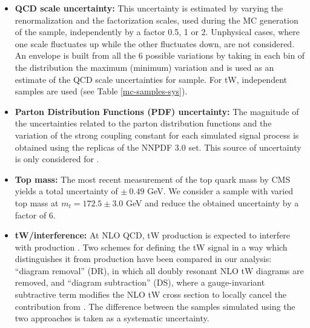 \begin{itemize}
  \item {\textbf{QCD scale uncertainty:} This uncertainty is estimated by varying the renormalization and the factorization scales, used during the MC generation of the sample, independently by a factor 0.5, 1 or 2. Unphysical cases, where one scale fluctuates up while the other fluctuates down, are not considered. An envelope is built from all the 6 possible variations by taking in each bin of the distribution the maximum (minimum) variation and is used as an estimate of the QCD scale uncertainties for \ttbar sample. For tW, independent samples are used (see Table \ref{mc-samples-sys}).}
  \item {\textbf{Parton Distribution Functions (PDF) uncertainty:} The magnitude of the uncertainties related to the parton distribution functions and the variation of the strong coupling constant for each simulated signal process is obtained using the replicas of the NNPDF 3.0 set. This source of uncertainty is only considered for \ttbar.}
  \item \textbf{Top mass:} The most recent measurement of the top quark mass by CMS yields a total uncertainty of $\pm~0.49$  GeV. We consider a sample with varied top mass at  $m_t=172.5\pm3.0$  GeV and reduce the obtained uncertainty by a factor of 6.
  \item \textbf{tW/\ttbar interference:} At NLO QCD, tW production is expected to interfere with \ttbar production \cite{Demartin:2016axk}. Two schemes for defining the tW signal in a way which distinguishes it from \ttbar production have been compared in our analysis: ``diagram removal'' (DR), in which all
doubly resonant NLO tW diagrams are removed,  and ``diagram subtraction'' (DS), where a gauge-invariant subtractive term modifies the NLO tW cross section to locally cancel the contribution from \ttbar. The difference between the samples simulated using the two approaches is taken as a systematic uncertainty.

\end{itemize}
